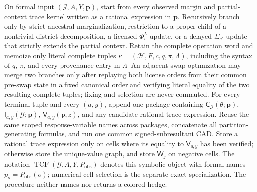 On formal input \((\mathcal G,A,Y,\mathbf p)\), start from every observed margin and partial-context trace kernel written as a rational expression in \(\mathbf p\). Recursively branch only by strict ancestral marginalization, restriction to a proper child of a nontrivial district decomposition, a licensed \(\Phi_v^{\lambda}\) update, or a delayed \(\Sigma_{c'}\) update that strictly extends the partial context. Retain the complete operation word and memoize only literal complete tuples \(\kappa=(\mathcal H,F,c,q,\pi,\Lambda)\), including the syntax of \(q\), \(\pi\), and every provenance entry in \(\Lambda\). An adjacent-swap optimization may merge two branches only after replaying both license orders from their common pre-swap state in a fixed canonical order and verifying literal equality of the two resulting complete tuples; fixing and selection are never commuted. For every terminal tuple and every \((a,y)\), append one package containing \(\mathsf C_{\mathcal G}(\theta;\mathbf p)\), \(\mathsf I_{a,y}(\mathcal G;\mathbf p)\), \(\mathsf V_{a,y}(\mathbf p,z)\), and any candidate rational trace expression. Reuse the same scoped response-variable names across packages, concatenate all partition-generating formulas, and run one common signed-subresultant CAD. Store a rational trace expression only on cells where its equality to \(\mathsf V_{a,y}\) has been verified; otherwise store the unique-value graph, and store \(\mathsf W_j\) on negative cells. The notation \(\operatorname{TCF}(\mathcal G,A,Y,P_{\mathrm{obs}})\) denotes this symbolic object with formal names \(p_o=P_{\mathrm{obs}}(o)\); numerical cell selection is the separate exact specialization. The procedure neither names nor returns a colored hedge.